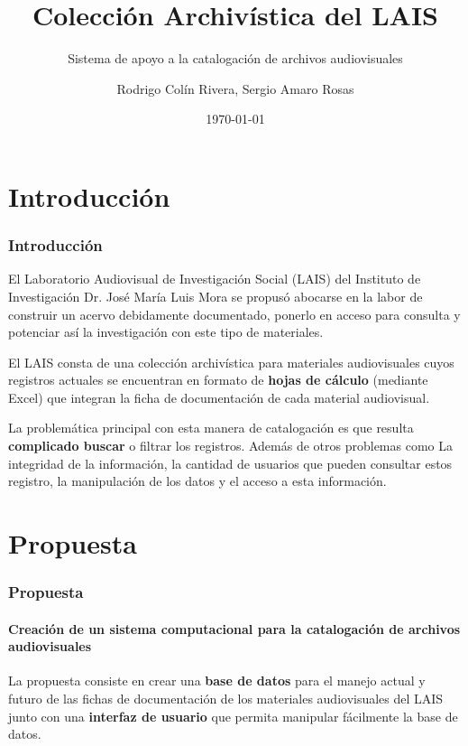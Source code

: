 \documentclass{beamer}
\title{Colección Archivística del LAIS}
\subtitle{Sistema de apoyo a la catalogación de archivos audiovisuales}
\author{Rodrigo Colín Rivera, Sergio Amaro Rosas}
\institute
{
  Laboratorio Audiovisual de Investigación Social\\
  Instituto de Investigaciones Dr. José María Luis Mora
}
\date{\today}
\begin{document}
\frame{\titlepage} %

\section{Introducción}
\begin{frame}
	\frametitle{Introducción}
	El Laboratorio Audiovisual de Investigación Social (LAIS) del Instituto de Investigación Dr. José María Luis Mora se propusó abocarse en la labor de construir un acervo debidamente documentado, ponerlo en acceso para consulta y potenciar así la investigación con este tipo de materiales.

	El LAIS consta de una colección archivística para materiales audiovisuales cuyos registros actuales se encuentran en formato de \textbf{hojas de cálculo} (mediante Excel) que integran la ficha de documentación de cada material audiovisual.
	
	La problemática principal con esta manera de catalogación es que resulta \textbf{complicado buscar} o filtrar los registros. Además de otros problemas como La integridad de la información, la cantidad de usuarios que pueden consultar estos registro, la manipulación de los datos y el acceso a esta información.
\end{frame}

\section{Propuesta}
\begin{frame}
	\frametitle{Propuesta}
	\framesubtitle{Creación de un sistema computacional para la catalogación de archivos audiovisuales}
	
	La propuesta consiste en crear una \textbf{base de datos} para el manejo actual y futuro de las fichas de documentación de los materiales audiovisuales del LAIS junto con una \textbf{interfaz de usuario} que permita manipular fácilmente la base de datos.
\end{frame}
\end{document}
